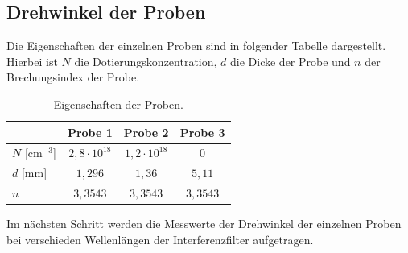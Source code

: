 \subsection{Drehwinkel der Proben}

Die Eigenschaften der einzelnen Proben sind in folgender Tabelle dargestellt. Hierbei ist $N$ die Dotierungskonzentration, $d$ die Dicke der Probe und $n$ \cite{Brechungsindex} der Brechungsindex der Probe.
\begin{table}[H]
    \centering
    \caption{Eigenschaften der Proben.}

    \begin{tabular}{lccc}
        \toprule
        & \textbf{Probe 1} & \textbf{Probe 2} & \textbf{Probe 3} \\
        \midrule
        $N$ [cm$^{-3}$] & $2,8 \cdot 10^{18}$ & $1,2 \cdot 10^{18}$ & $0$ \\
        $d$ [mm] & $1,296$ & $1,36$ & $5,11$ \\
        $n$ & $3,3543$ & $3,3543$ & $3,3543$ \\
        \bottomrule
    \end{tabular}
\end{table}

Im nächsten Schritt werden die Messwerte der Drehwinkel der einzelnen Proben bei verschieden Wellenlängen der Interferenzfilter aufgetragen.

